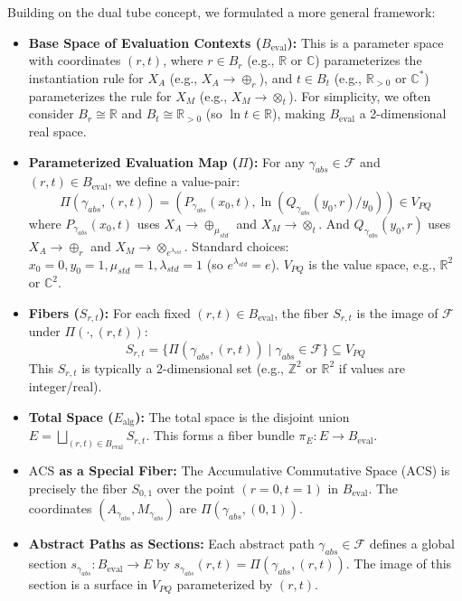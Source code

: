 \documentclass{article}[a4paper,12pt]
\begin{document}
Building on the dual tube concept, we formulated a more general framework:
\begin{itemize}
    \item \textbf{Base Space of Evaluation Contexts ($B_{\text{eval}}$):} This is a parameter space with coordinates $(r,t)$, where $r \in B_r$ (e.g., $\mathbb{R}$ or $\mathbb{C}$) parameterizes the instantiation rule for $X_A$ (e.g., $X_A \to \oplus_r$), and $t \in B_t$ (e.g., $\mathbb{R}_{>0}$ or $\mathbb{C}^*$) parameterizes the rule for $X_M$ (e.g., $X_M \to \otimes_t$). For simplicity, we often consider $B_r \cong \mathbb{R}$ and $B_t \cong \mathbb{R}_{>0}$ (so $\ln t \in \mathbb{R}$), making $B_{\text{eval}}$ a 2-dimensional real space.
    \item \textbf{Parameterized Evaluation Map ($\Pi$):} For any $\gamma_{abs} \in \mathcal{F}$ and $(r,t) \in B_{\text{eval}}$, we define a value-pair:
    \[ \Pi(\gamma_{abs}, (r,t)) = (P_{\gamma_{abs}}(x_0,t), \ln(Q_{\gamma_{abs}}(y_0,r)/y_0)) \in V_{PQ} \]
    where $P_{\gamma_{abs}}(x_0,t)$ uses $X_A \to \oplus_{\mu_{std}}$ and $X_M \to \otimes_t$.
    And $Q_{\gamma_{abs}}(y_0,r)$ uses $X_A \to \oplus_r$ and $X_M \to \otimes_{e^{\lambda_{std}}}$.
    Standard choices: $x_0=0, y_0=1, \mu_{std}=1, \lambda_{std}=1$ (so $e^{\lambda_{std}}=e$). $V_{PQ}$ is the value space, e.g., $\mathbb{R}^2$ or $\mathbb{C}^2$.
    \item \textbf{Fibers ($S_{r,t}$):} For each fixed $(r,t) \in B_{\text{eval}}$, the fiber $S_{r,t}$ is the image of $\mathcal{F}$ under $\Pi(\cdot, (r,t))$:
    \[ S_{r,t} = \{ \Pi(\gamma_{abs}, (r,t)) \mid \gamma_{abs} \in \mathcal{F} \} \subseteq V_{PQ} \]
    This $S_{r,t}$ is typically a 2-dimensional set (e.g., $\mathbb{Z}^2$ or $\mathbb{R}^2$ if values are integer/real).
    \item \textbf{Total Space ($E_{\text{alg}}$):} The total space is the disjoint union $E = \bigsqcup_{(r,t) \in B_{\text{eval}}} S_{r,t}$. This forms a fiber bundle $\pi_E: E \to B_{\text{eval}}$.
    \item \textbf{$\mathrm{ACS}$ as a Special Fiber:} The Accumulative Commutative Space ($\mathrm{ACS}$) is precisely the fiber $S_{0,1}$ over the point $(r=0, t=1)$ in $B_{\text{eval}}$. The coordinates $(A_{\gamma_{abs}}, M_{\gamma_{abs}})$ are $\Pi(\gamma_{abs}, (0,1))$.
    \item \textbf{Abstract Paths as Sections:} Each abstract path $\gamma_{abs} \in \mathcal{F}$ defines a global section $s_{\gamma_{abs}}: B_{\text{eval}} \to E$ by $s_{\gamma_{abs}}(r,t) = \Pi(\gamma_{abs}, (r,t))$. The image of this section is a surface in $V_{PQ}$ parameterized by $(r,t)$.
\end{itemize}
\end{document}
